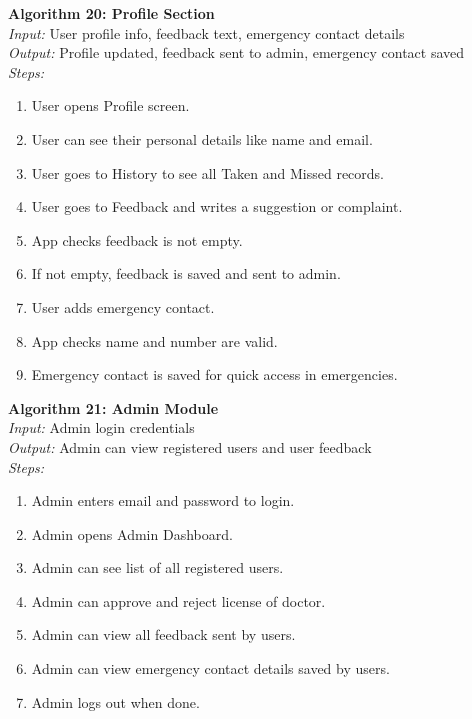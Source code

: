 \textbf{Algorithm 20: Profile Section}\\
\textit{Input:} User profile info, feedback text, emergency contact details\\
\textit{Output:} Profile updated, feedback sent to admin, emergency contact saved\\
\textit{Steps:}
\begin{enumerate}
    \item User opens Profile screen.
    \item User can see their personal details like name and email.
    \item User goes to History to see all Taken and Missed records.
    \item User goes to Feedback and writes a suggestion or complaint.
    \item App checks feedback is not empty.
    \item If not empty, feedback is saved and sent to admin.
    \item User adds emergency contact.
    \item App checks name and number are valid.
    \item Emergency contact is saved for quick access in emergencies.
\end{enumerate}

\textbf{Algorithm 21: Admin Module}\\
\textit{Input:} Admin login credentials\\
\textit{Output:} Admin can view registered users and user feedback\\
\textit{Steps:}
\begin{enumerate}
    \item Admin enters email and password to login.
    \item Admin opens Admin Dashboard.
    \item Admin can see list of all registered users.
    \item Admin can approve and reject license of doctor.
    \item Admin can view all feedback sent by users.
    \item Admin can view emergency contact details saved by users.
    \item Admin logs out when done.
\end{enumerate}
